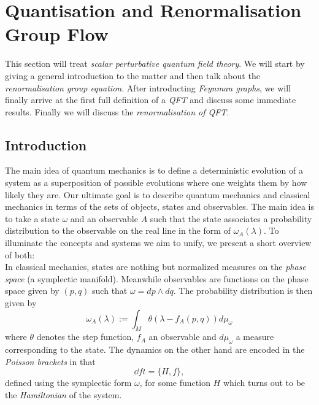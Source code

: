 \section{Quantisation and Renormalisation Group Flow}
\label{sec:Renormalisation}

This section will treat \emph{scalar perturbative quantum field theory}. We will start by giving a general introduction to the matter and then talk about the \emph{renormalisation group equation}. After introducting \emph{Feynman graphs}, we will finally arrive at the first full definition of a \emph{QFT} and discuss some immediate results. Finally we will discuss the \emph{renormalisation of QFT}.

\subsection{Introduction}
\label{subsec:quantisation_intro}

The main idea of quantum mechanics is to define a deterministic evolution of a system as a superposition of possible evolutions where one weights them by how likely they are. Our ultimate goal is to describe quantum mechanics and classical mechanics in terms of the sets of objects, states and observables. The main idea is to take a state $\omega$ and an observable $A$ such that the state associates a probability distribution to the observable on the real line in the form of $\omega_A(\lambda)$. To illuminate the concepts and systems we aim to unify, we present a short overview of both:\\

In classical mechanics, states are nothing but normalized measures on the \emph{phase space} (a symplectic manifold). Meanwhile observables are functions on the phase space given by $(p,q)$ such that $\omega = dp \wedge dq$. The probability distribution is then given by
$$ \omega_A (\lambda) := \int_M \theta(\lambda - f_A (p,q)) d \mu_\omega$$
where $\theta$ denotes the step function, $f_A$ an observable and $d\mu_\omega$ a measure corresponding to the state. The dynamics on the other hand are encoded in the \emph{Poisson brackets} in that
$$ \dd{f}{t} = \{H, f\}, $$
defined using the symplectic form $\omega$, for some function $H$ which turns out to be the \emph{Hamiltonian} of the system.\\

